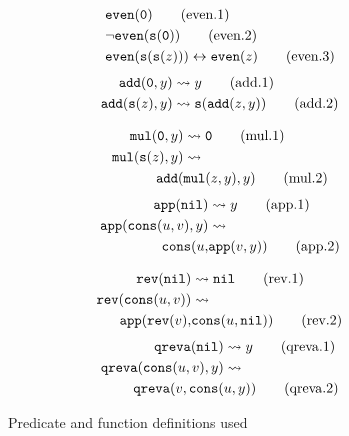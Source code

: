 
\begin{figure*}
    \small
    \begin{minipage}[t]{0.33\textwidth}
        \begin{align}
        &\mathtt{even}(\mathtt{0})\label{even1}\tag{even.1}\\
        &\neg\mathtt{even}(\mathtt{s}(\mathtt{0}))\label{even2}\tag{even.2}\\
        &\mathtt{even}(\mathtt{s}(\mathtt{s}(z)))\leftrightarrow \mathtt{even}(z)\label{even3}\tag{even.3}\end{align}
        \dotfill
        \begin{align}
        \mathtt{add}(\mathtt{0},y)&\rightsquigarrow y\label{add1}\tag{add.1}\\ \mathtt{add}(\mathtt{s}(z),y)&\rightsquigarrow\mathtt{s}(\mathtt{add}(z,y))\label{add2}\tag{add.2}\end{align}
    \end{minipage}\begin{minipage}[t]{0.33\textwidth}
        \begin{align}
        \mathtt{mul}(\mathtt{0},y)&\rightsquigarrow \mathtt{0}\label{mul1}\tag{mul.1}\\
        \mathtt{mul}(\mathtt{s}(z),y)&\rightsquigarrow\nonumber\\ \mathtt{add}(&\mathtt{mul}(z,y),y)\label{mul2}\tag{mul.2}\end{align}
        \dotfill
        \begin{align}
        \mathtt{app}(\mathtt{nil})&\rightsquigarrow y\label{app1}\tag{app.1}\\ \mathtt{app}(\mathtt{cons}(u,v),y)&\rightsquigarrow\nonumber\\\mathtt{cons}(u,&\mathtt{app}(v,y))\label{app2}\tag{app.2}\end{align}
    \end{minipage}\begin{minipage}[t]{0.33\textwidth}
        \begin{align}
        \mathtt{rev}(\mathtt{nil})&\rightsquigarrow \mathtt{nil}\label{rev1}\tag{rev.1}\\ \mathtt{rev}(\mathtt{cons}(u,v))&\rightsquigarrow\nonumber\\
        \mathtt{app}(\mathtt{rev}(v),&\mathtt{cons}(u,\mathtt{nil}))\label{rev2}\tag{rev.2}\end{align}
        \dotfill
        \begin{align}
        \mathtt{qreva}(\mathtt{nil})&\rightsquigarrow y\label{qreva1}\tag{qreva.1}\\ \mathtt{qreva}(\mathtt{cons}(u,v),y)&\rightsquigarrow\nonumber\\\mathtt{qreva}(v,\mathtt{cons}(&u,y))\label{qreva2}\tag{qreva.2}\end{align}
    \end{minipage}
    \caption{Predicate and function definitions used}
    \label{fig:defs}
\end{figure*}
\normalsize


